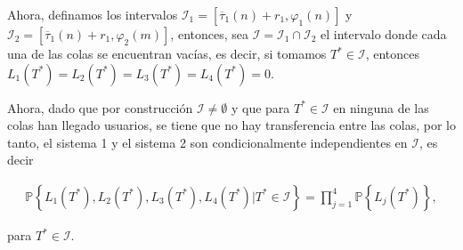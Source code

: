 \documentclass{article}
\newcommand{\prob}{\mathbb{P}}
\begin{document}
Ahora, definamos los intervalos $\mathcal{I}_{1}=\left[\overline{\tau}_{1}\left(n\right)+r_{1},\varphi_{1}\left(n\right)\right]$  y $\mathcal{I}_{2}=\left[\overline{\tau}_{1}\left(n\right)+r_{1},\varphi_{2}\left(m\right)\right]$, entonces, sea $\mathcal{I}=\mathcal{I}_{1}\cap\mathcal{I}_{2}$ el intervalo donde cada una de las colas se encuentran vac\'ias, es decir, si tomamos $T^{*}\in\mathcal{I}$, entonces  $L_{1}\left(T^{*}\right)=L_{2}\left(T^{*}\right)=L_{3}\left(T^{*}\right)=L_{4}\left(T^{*}\right)=0$.

Ahora, dado que por construcci\'on $\mathcal{I}\neq\emptyset$ y que para $T^{*}\in\mathcal{I}$ en ninguna de las colas han llegado usuarios, se tiene que no hay transferencia entre las colas, por lo tanto, el sistema 1 y el sistema 2 son condicionalmente independientes en $\mathcal{I}$, es decir

\begin{eqnarray}
\prob\left\{L_{1}\left(T^{*}\right),L_{2}\left(T^{*}\right),L_{3}\left(T^{*}\right),L_{4}\left(T^{*}\right)|T^{*}\in\mathcal{I}\right\}=\prod_{j=1}^{4}\prob\left\{L_{j}\left(T^{*}\right)\right\},
\end{eqnarray}

para $T^{*}\in\mathcal{I}$. 

























\end{document}
